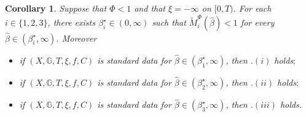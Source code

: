 \documentclass[10pt]{article} %
\newtheorem{corollary}[theorem]{Corollary}
\def \G{\mathbb{G}}
\newcommand{\1}{\mathbf{1}}
\begin{document}
\begin{corollary}\label{cor::main_result_bsde}
Suppose that $\Phi < 1$ and that $\xi = -\infty$ on $[0,T)$. For each $i \in \{1,2,3\}$, there exists $\beta^\star_i \in (0,\infty)$ such that $\widetilde M^\Phi_i(\hat\beta) <1$ for every $\hat\beta \in (\beta^\star_i,\infty)$. Moreover
	\begin{itemize}
		\item[$(i)$] if $(X,\G,T,\xi,f,C)$ is standard data for $\hat\beta \in (\beta^\star_1,\infty)$, then {\rm{}.$(i)$} holds$;$
		\item[$(ii)$] if $(X,\G,T,\xi,f,C)$ is standard data for $\hat\beta \in (\beta^\star_2,\infty)$, then {\rm{}.$(ii)$} holds$;$
		\item[$(iii)$] if $(X,\G,T,\xi,f,C)$ is standard data for $\hat\beta \in (\beta^\star_3,\infty)$, then {\rm{}.$(iii)$} holds.
	\end{itemize}
\end{corollary}
\end{document}
